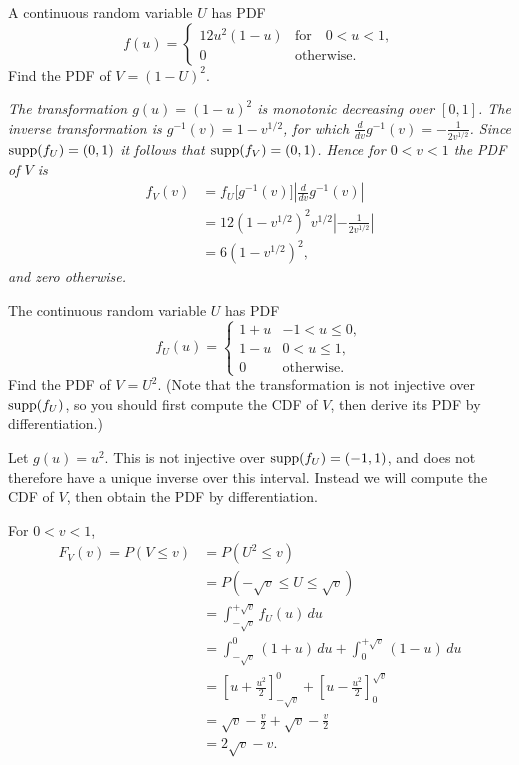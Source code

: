 \begin{exercise}
\begin{questions}
\question
A continuous random variable $U$ has PDF
\[
f(u) = \left\{\begin{array}{ll}
	12u^{2}(1-u) 	& \text{for}\quad 0 < u < 1, \\
	0				& \text{otherwise.}
\end{array}\right.	
\]
Find the PDF of $V = (1 - U)^{2}$.


\begin{answer}
\bit
\it The transformation $g(u) = (1 - u)^{2}$ is monotonic decreasing over $[0,1]$.  
\it The inverse transformation is $g^{-1}(v) = 1 - v^{1/2}$, for which $\displaystyle \frac{d}{dv}g^{-1}(v) = -\frac{1}{2v^{1/2}}$.
\it Since $\text{supp}(f_U)=(0,1)$ it follows that $\text{supp}(f_V)=(0,1)$. 
\eit
Hence for $0<v<1$ the PDF of $V$ is 
\begin{align*}
f_V(v)
	& = f_U\big[g^{-1}(v)\big]\left|\frac{d}{dv}g^{-1}(v)\right| \\
	& = 12(1-v^{1/2})^2 v^{1/2}\left|-\frac{1}{2v^{1/2}}\right| \\
	& = 6(1-v^{1/2})^2,
\end{align*}
and zero otherwise. 
\end{answer}

\question
The continuous random variable $U$ has PDF
\[
f_U(u) = \left\{\begin{array}{ll}
	1 + u  	& -1 < u \leq 0, \\
	1 - u  	&  0 < u \leq 1, \\
	0		& \text{otherwise.}
\end{array}\right.
\]
Find the PDF of $V = U^2$. (Note that the transformation is not injective over $\text{supp}(f_U)$, so you should first compute the CDF of $V$, then derive its PDF by differentiation.)


\begin{answer}
Let $g(u) = u^2$. This is not injective over $\text{supp}(f_U)=(-1,1)$, and does not therefore have a unique inverse over this interval. Instead we will compute the CDF of $V$, then obtain the PDF by differentiation.

For $0<v<1$,
\begin{align*}
F_{V}(v) 
	= P(V\leq v)
	& = P(U^{2} \leq v) \\
	& = P(-\sqrt{v} \leq U \leq \sqrt{v}) \\ 
	& = \int_{-\sqrt{v} }^{+\sqrt{v} }f_{U}(u) \,du \\
	& = \int_{-\sqrt{v} }^{0}(1+u)\,du + \int_{0}^{+\sqrt{v} }(1-u)\,du \\
	& = \left[u+\frac{u^{2}}{2}\right]_{-\sqrt{v} }^{0} + \left[u-\frac{u^{2}}{2}\right]_{0}^{\sqrt{v}} \\
	& = \sqrt{v} -\frac{v}{2} + \sqrt{v} -\frac{v}{2} \\
	& = 2\sqrt{v}-v.%
\end{align*}


\end{answer}
\end{questions}
\end{exercise}
